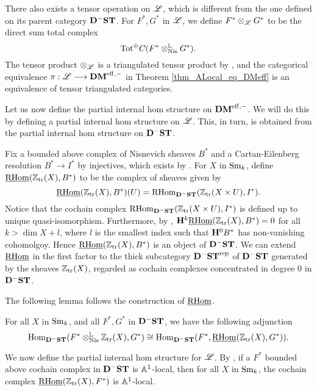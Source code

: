 There also exists a tensor operation on $\ALocal$, which is different
from the one defined on its parent category $\DShCor$.  For $F^*, G^*$
in $\ALocal$, we define $F^* \tAL G^*$ to be the direct sum total 
complex 
\[
\mathrm{Tot}^{\oplus} \suslC[]( F^* \tLNis G^* ).
\]
The tensor product $\tAL$ is a triangulated tensor product
by \cite[14.11]{MVW}, and the categorical equivalence $\pi: 
\ALocal \to \DMeff$ in Theorem \ref{thm_ALocal_eq_DMeff} is an 
equivalence of tensor triangulated categories.

Let us now define the partial internal hom structure on $\DMeff$.
We will do this by defining a partial internal hom structure on
$\ALocal$. This, in turn, is obtained from the partial internal 
hom structure on $\DShCor$.

\begin{defn}\label{def_pihom_DShCor}
Fix a bounded above complex of Nisnevich sheaves $B^*$ and a
Cartan-Eilenberg resolution $B^* \to I^*$ by injectives, which
exists by \cite[6.19]{MVW}. For $X$ in $\Sm$, define 
$\sheaf{\rhom}(\Ztr(X), B^*)$ to be the complex of sheaves given 
by
\[
\sheaf{\rhom}(\Ztr(X), B^*)(U) = \rhom_{\DShCor}(\Ztr(X \times U),
I^*).
\]
Notice that the cochain complex $\rhom_{\DShCor}(\Ztr(X \times U), I^*)$
is defined up to unique quasi-isomorphism. Furthermore, by \cite[3.2.9]{TriCa}, $\HH^k \sheaf{\rhom}(\Ztr(X), B^*) = 0$ for
all $k > \dim X + l$, where $l$ is the smallest index such that
$\HH^0B^*$ has non-vanishing cohomolgoy. Hence $\sheaf{\rhom}(\Ztr(X),
B^*)$ is an object of $\DShCor$. We can extend $\sheaf{\rhom}$ in the
first factor to the thick subcategory $\DShCor^{\compact}$ of 
$\DShCor$ generated by the sheaves $\Ztr(X)$, regarded as
cochain complexes concentrated in degree 0 in $\DShCor$. 
\end{defn}

The following lemma follows the construction of $\sheaf{\rhom}$.

\begin{lem}\label{lem_ihom_tL_adjunction}
For all $X$ in $\Sm$, and all $F^*, G^*$ in $\DShCor$, we 
have the following adjunction
\[
\hom_{\DShCor}(F^*\tLNis \Ztr(X), G^*) \cong
\hom_{\DShCor}(F^*, \sheaf{\rhom}(\Ztr(X), G^*)).
\]
\end{lem}

We now define the partial internal hom structure for $\ALocal$.
By \cite[14.12]{MVW}, if a $F^*$ bounded above cochain complex
in $\DShCor$ is $\A^1$-local, then for all $X$ in $\Sm$,
the cochain complex $\sheaf{\rhom}(\Ztr(X), F^*)$ is $\A^1$-local. 

